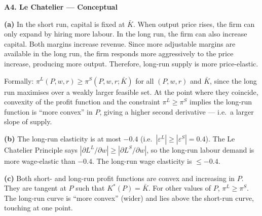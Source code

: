 \documentclass[12pt, a4paper]{article}
\theoremstyle{definition}
\begin{document}
\begin{solbox}
\textbf{A4. Le Chatelier --- Conceptual}

\textbf{(a)} In the short run, capital is fixed at $\bar K$. When output price rises, the firm can only expand by hiring more labour. In the long run, the firm can also increase capital. Both margins increase revenue. Since more adjustable margins are available in the long run, the firm responds more aggressively to the price increase, producing more output. Therefore, long-run supply is more price-elastic.

Formally: $\pi^L(P,w,r) \geq \pi^S(P,w,r;\bar K)$ for all $(P,w,r)$ and $\bar K$, since the long run maximises over a weakly larger feasible set. At the point where they coincide, convexity of the profit function and the constraint $\pi^L \geq \pi^S$ implies the long-run function is ``more convex'' in $P$, giving a higher second derivative --- i.e.\ a larger slope of supply.

\textbf{(b)} The long-run elasticity is at most $-0.4$ (i.e.\ $|\varepsilon^L| \geq |\varepsilon^S| = 0.4$). The Le Chatelier Principle says $|\partial L^L/\partial w| \geq |\partial L^S/\partial w|$, so the long-run labour demand is more wage-elastic than $-0.4$. The long-run wage elasticity is $\leq -0.4$.

\textbf{(c)} Both short- and long-run profit functions are convex and increasing in $P$. They are tangent at $P$ such that $K^*(P)=\bar K$. For other values of $P$, $\pi^L \geq \pi^S$. The long-run curve is ``more convex'' (wider) and lies above the short-run curve, touching at one point.

\begin{center}
\end{center}
\end{solbox}
\end{document}
